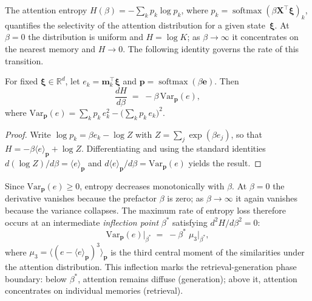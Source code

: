 The attention entropy $H(\beta) = -\sum_k p_k \log p_k$, where $p_k = \operatorname{softmax}(\beta\mathbf{X}^{\top}\boldsymbol{\xi})_k$, quantifies the selectivity of the attention distribution for a given state~$\boldsymbol{\xi}$. At $\beta=0$ the distribution is uniform and $H=\log K$; as $\beta\to\infty$ it concentrates on the nearest memory and $H\to 0$. The following identity governs the rate of this transition.

\begin{proposition}\label{prop:entropy-derivative}
For fixed $\boldsymbol{\xi}\in\mathbb{R}^d$, let $e_k = \mathbf{m}_k^{\top}\boldsymbol{\xi}$ and $\mathbf{p}=\operatorname{softmax}(\beta\mathbf{e})$. Then
\begin{equation}\label{eq:entropy-deriv}
\frac{dH}{d\beta} \;=\; -\beta\,\mathrm{Var}_{\mathbf{p}}(e),
\end{equation}
where $\mathrm{Var}_{\mathbf{p}}(e) = \sum_k p_k\,e_k^2 - \bigl(\sum_k p_k\,e_k\bigr)^{\!2}$.
\end{proposition}

\begin{proof}
Write $\log p_k = \beta e_k - \log Z$ with $Z=\sum_j\exp(\beta e_j)$, so that $H = -\beta\langle e\rangle_{\mathbf{p}} + \log Z$. Differentiating and using the standard identities $d(\log Z)/d\beta = \langle e\rangle_{\mathbf{p}}$ and $d\langle e\rangle_{\mathbf{p}}/d\beta = \mathrm{Var}_{\mathbf{p}}(e)$ yields the result.
\end{proof}

Since $\mathrm{Var}_{\mathbf{p}}(e)\ge 0$, entropy decreases monotonically with $\beta$. At $\beta=0$ the derivative vanishes because the prefactor $\beta$ is zero; as $\beta\to\infty$ it again vanishes because the variance collapses. The maximum rate of entropy loss therefore occurs at an intermediate \emph{inflection point} $\beta^{*}$ satisfying $d^{2}H/d\beta^{2}=0$:
\begin{equation}\label{eq:inflection}
\mathrm{Var}_{\mathbf{p}}(e)\big|_{\beta^{*}} \;=\; -\beta^{*}\;\mu_{3}\big|_{\beta^{*}},
\end{equation}
where $\mu_3 = \langle(e - \langle e\rangle_{\mathbf{p}})^3\rangle_{\mathbf{p}}$ is the third central moment of the similarities under the attention distribution. This inflection marks the retrieval-generation phase boundary: below $\beta^{*}$, attention remains diffuse (generation); above it, attention concentrates on individual memories (retrieval).

